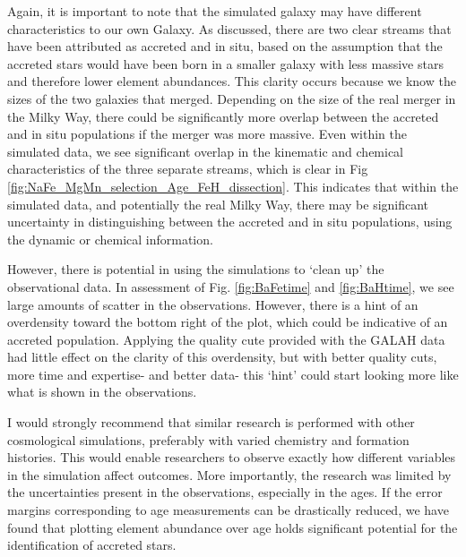 \documentclass[fleqn,usenatbib]{mnras}
\begin{document}
Again, it is important to note that the simulated galaxy may have different characteristics to our own Galaxy. As discussed, there are two clear streams that have been attributed as accreted and in situ, based on the assumption that the accreted stars would have been born in a smaller galaxy with less massive stars and therefore lower element abundances. This clarity occurs because we know the sizes of the two galaxies that merged. Depending on the size of the real merger in the Milky Way, there could be significantly more overlap between the accreted and in situ populations if the merger was more massive. Even within the simulated data, we see significant overlap in the kinematic and chemical characteristics of the three separate streams, which is clear in Fig \ref{fig:NaFe_MgMn_selection_Age_FeH_dissection}. This indicates that within the simulated data, and potentially the real Milky Way, there may be significant uncertainty in distinguishing between the accreted and in situ populations, using the dynamic or chemical information. \par 
However, there is potential in using the simulations to ‘clean up’ the observational data. In assessment of Fig. \ref{fig:BaFetime} and \ref{fig:BaHtime}, we see large amounts of scatter in the observations. However, there is a hint of an overdensity toward the bottom right of the plot, which could be indicative of an accreted population. Applying the quality cute provided with the GALAH data had little effect on the clarity of this overdensity, but with better quality cuts, more time and expertise- and better data- this ‘hint’ could start looking more like what is shown in the observations.\par 
I would strongly recommend that similar research is performed with other cosmological simulations, preferably with varied chemistry and formation histories. This would enable researchers to observe exactly how different variables in the simulation affect outcomes. More importantly, the research was limited by the uncertainties present in the observations, especially in the ages. If the error margins corresponding to age measurements can be drastically reduced, we have found that plotting element abundance over age holds significant potential for the identification of accreted stars. \par 
\end{document}
